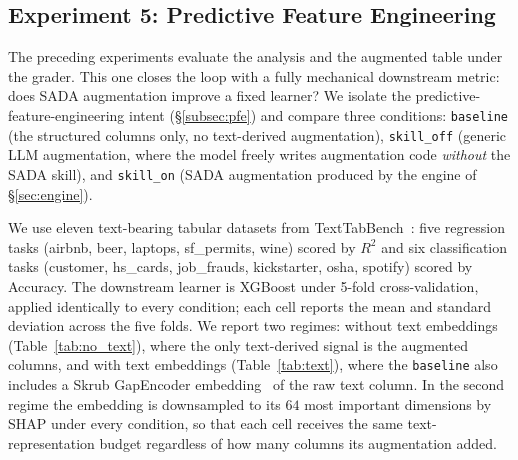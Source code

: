 \subsection{Experiment 5: Predictive Feature Engineering}
\label{subsec:exp-pfe}

The preceding experiments evaluate the analysis and the augmented table under the grader. This one closes the loop with a fully mechanical downstream metric: does SADA augmentation improve a fixed learner? We isolate the predictive-feature-engineering intent (\S\ref{subsec:pfe}) and compare three conditions: \texttt{baseline} (the structured columns only, no text-derived augmentation), \texttt{skill\_off} (generic LLM augmentation, where the model freely writes augmentation code \emph{without} the SADA skill), and \texttt{skill\_on} (SADA augmentation produced by the engine of \S\ref{sec:engine}).

We use eleven text-bearing tabular datasets from TextTabBench~\citep{texttabbench2025}: five regression tasks (airbnb, beer, laptops, sf\_permits, wine) scored by $R^2$ and six classification tasks (customer, hs\_cards, job\_frauds, kickstarter, osha, spotify) scored by Accuracy. The downstream learner is XGBoost under 5-fold cross-validation, applied identically to every condition; each cell reports the mean and standard deviation across the five folds. We report two regimes: without text embeddings (Table~\ref{tab:no_text}), where the only text-derived signal is the augmented columns, and with text embeddings (Table~\ref{tab:text}), where the \texttt{baseline} also includes a Skrub \textsf{GapEncoder} embedding~\citep{skrub2024} of the raw text column. In the second regime the embedding is downsampled to its $64$ most important dimensions by SHAP under every condition, so that each cell receives the same text-representation budget regardless of how many columns its augmentation added.

